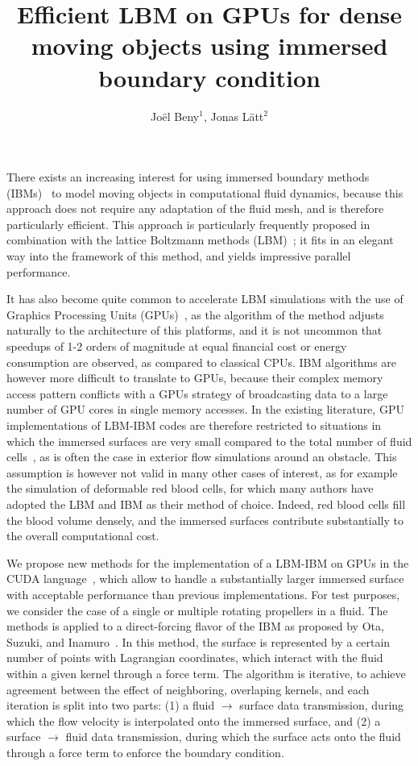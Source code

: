 \documentclass{cilamce}
\title{Efficient LBM on GPUs for dense moving objects using immersed boundary condition}
\author{Jo\"el Beny$^1$, Jonas L\"att$^2$}
\begin{document}
\maketitle

There exists an increasing interest for using immersed boundary methods (IBMs)~\cite{peskin} to model moving objects in computational fluid dynamics, because this approach does not require any adaptation of the fluid mesh, and is therefore particularly efficient. This approach is particularly frequently proposed in combination with the lattice Boltzmann methods (LBM)~\cite{bgk, lbm}; it fits in an elegant way into the framework of this method, and yields impressive parallel performance.

It has also become quite common to accelerate LBM simulations with the use of Graphics Processing Units (GPUs)~\cite{tolke}, as the algorithm of the method adjusts naturally to the architecture of this platforms, and it is not uncommon that speedups of 1-2 orders of magnitude at equal financial cost or energy consumption are observed, as compared to classical CPUs. IBM algorithms are however more difficult to translate to GPUs, because their complex memory access pattern conflicts with a GPUs strategy of broadcasting data to a large number of GPU cores in single memory accesses. In the existing literature, GPU implementations of LBM-IBM codes are therefore restricted to situations in which the immersed surfaces are very small compared to the total number of fluid cells~\cite{lara}, as is often the case in exterior flow simulations around an obstacle. This assumption is however not valid in many other cases of interest, as for example the simulation of deformable red blood cells, for which many authors have adopted the LBM and IBM as their method of choice. Indeed, red blood cells fill the blood volume densely, and the immersed surfaces contribute substantially to the overall computational cost.

We propose new methods for the implementation of a LBM-IBM on GPUs in the CUDA language~\cite{cuda}, which allow to handle a substantially larger immersed surface with acceptable performance than previous implementations. For test purposes, we consider the case of a single or multiple rotating propellers in a fluid. The methods is applied to a direct-forcing flavor of the IBM as proposed by Ota, Suzuki, and Inamuro~\cite{ota}. In this method, the surface is represented by a certain number of points with Lagrangian coordinates, which interact with the fluid within a given kernel through a force term. The algorithm is iterative, to achieve agreement between the effect of neighboring, overlaping kernels, and each iteration is split into two parts: (1) a fluid $\rightarrow$ surface data transmission, during which the flow velocity is interpolated onto the immersed surface, and (2) a surface $\rightarrow$ fluid data transmission, during which the surface acts onto the fluid through a force term to enforce the boundary condition.
\end{document}
